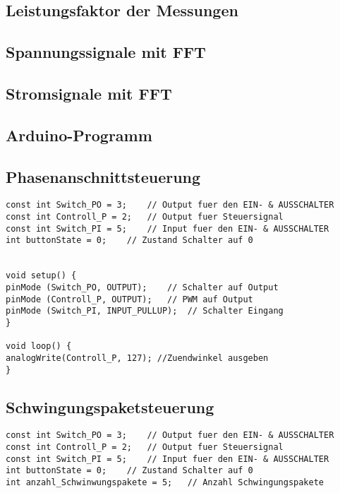 \begin{appendix}
\subsection*{Leistungsfaktor der Messungen}\label{sec:Leistungsfaktor_Messungen}


\subsection*{Spannungssignale mit FFT}\label{sec:Spannungen_Messungen}


\subsection*{Stromsignale mit FFT}\label{sec:Stroeme_Messungen}



\newpage
\subsection{Arduino-Programm}

\subsection*{Phasenanschnittsteuerung}
\begin{lstlisting}[basicstyle=\tiny,style=myArduino]
const int Switch_PO = 3;	// Output fuer den EIN- & AUSSCHALTER
const int Controll_P = 2;	// Output fuer Steuersignal
const int Switch_PI = 5;	// Input fuer den EIN- & AUSSCHALTER
int buttonState = 0;	// Zustand Schalter auf 0


void setup() {
pinMode (Switch_PO, OUTPUT);	// Schalter auf Output
pinMode (Controll_P, OUTPUT);	// PWM auf Output
pinMode (Switch_PI, INPUT_PULLUP);	// Schalter Eingang
}

void loop() {
analogWrite(Controll_P, 127); //Zuendwinkel ausgeben
}
\end{lstlisting}


\subsection*{Schwingungspaketsteuerung}
\begin{lstlisting}[basicstyle=\tiny,style=myArduino]
const int Switch_PO = 3;	// Output fuer den EIN- & AUSSCHALTER
const int Controll_P = 2;	// Output fuer Steuersignal
const int Switch_PI = 5;	// Input fuer den EIN- & AUSSCHALTER
int buttonState = 0;	// Zustand Schalter auf 0
int anzahl_Schwinwungspakete = 5;	// Anzahl Schwingungspakete


\end{lstlisting}
\end{appendix}
